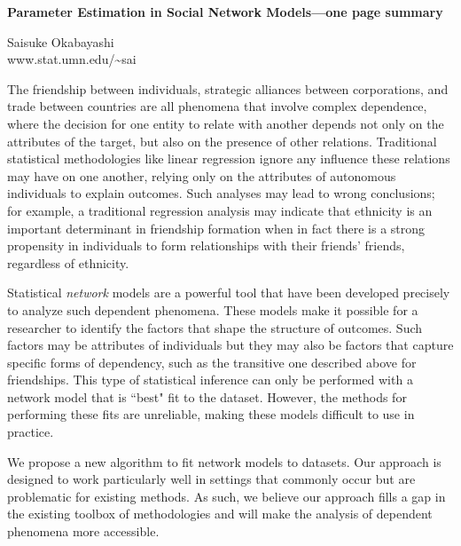 \documentclass[12pt]{article}
\begin{document}
\begin{center}
{\normalsize{\textbf{Parameter Estimation in Social Network Models---one page summary}} }

\vspace{0.15in}
{Saisuke Okabayashi} \\
www.stat.umn.edu/\textasciitilde sai\\
\end{center}

The friendship between individuals, strategic alliances
between corporations, and trade between countries
are all phenomena that involve complex dependence, where the 
decision for one entity to relate with another depends not only on the attributes of 
the target, but also on the presence of other relations.  
 Traditional statistical methodologies like linear regression 
ignore any influence these relations may 
have on one another, relying only on the attributes of autonomous individuals to explain outcomes.
Such analyses may lead to wrong conclusions; for example,
a traditional regression analysis may indicate that ethnicity is an important determinant in friendship formation when
in fact there is a strong propensity in individuals to form relationships with their friends' friends,
regardless of ethnicity.

Statistical \emph{network} models are a powerful tool that have been developed 
precisely to analyze such dependent phenomena.
These models make it possible for a researcher to identify the 
factors that shape the structure 
of outcomes.  Such factors may be attributes of individuals but they may also be factors
that capture specific forms of dependency, such as the transitive one described above for friendships.
This type of statistical inference can only be performed with a network model that is ``best" fit 
to the dataset. However, the methods for performing these fits are unreliable, making
these models difficult to use in practice.

We propose a new algorithm to fit network models to datasets.
Our approach  is designed to work particularly well in settings that commonly occur but are 
problematic for existing methods.  As such, we believe our approach fills a gap in the
existing toolbox of methodologies and will make the analysis of dependent phenomena more accessible.
\end{document}
